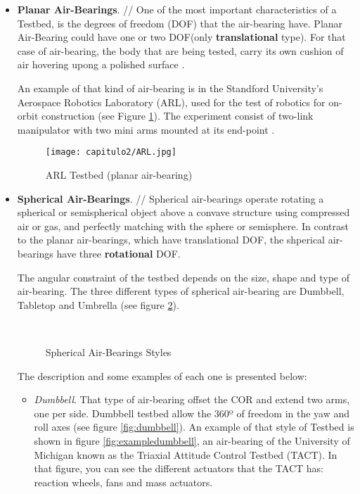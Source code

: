 \begin{itemize}
\item \textbf{Planar Air-Bearings}. //
One of the most important characteristics of a Testbed, is the degrees of freedom (\acrshort{DOF}) that the air-bearing have. Planar Air-Bearing could have one or two \acrshort{DOF}(only \textbf{translational} type). 
For that case of air-bearing, the body that are being tested, carry its own cushion of air hovering upong a polished surface \cite{typestestbed}.

An example of that kind of air-bearing is in the Standford University's Aerospace Robotics Laboratory (ARL), used for the test of robotics for on-orbit construction (see Figure \ref{fig:ARL}). The experiment consist of two-link manipulator with two mini arms mounted at its end-point \cite{ARLtext}. 

\begin{figure}[H]
	\centering
		\texttt{[image: capitulo2/ARL.jpg]}
	\caption{ARL Testbed (planar air-bearing)\cite{ARLtext}}
	\label{fig:ARL}
\end{figure}

\item \textbf{Spherical Air-Bearings}. // Spherical air-bearings operate rotating a spherical or semispherical object above a convave structure using compressed air or gas, and perfectly matching with the sphere or semisphere.
In contrast to the planar air-bearings, which have translational \acrshort{DOF}, the shperical air-bearings have three  \textbf{rotational} \acrshort{DOF}. 

The angular constraint of the testbed depends on the size, shape and type of air-bearing. The three different types of spherical air-bearing are Dumbbell, Tabletop and Umbrella (see figure \ref{fig:airtypes}). 

\begin{figure}[H]
\centering
{} 
 \\
\caption{Spherical Air-Bearings Styles \cite{typestestbed}} \label{fig:airtypes}
\end{figure}

The description and some examples of each one is presented below:
\begin{itemize}
\item \textit{Dumbbell}. That type of air-bearing offset the \acrshort{COR} and extend two arms, one per side. Dumbbell testbed allow the 360º of freedom in the yaw and roll axes (see figure \ref{fig:dumbbell}). An example of that style of Testbed is shown in figure \ref{fig:exampledumbbell}, an air-bearing of the University of Michigan known as the Triaxial Attitude Control Testbed (\acrshort{TACT}). In that figure, you can see the different actuators that the \acrshort{TACT} has: reaction wheels, fans and mass actuators. \cite{michigantestbed}


\end{itemize}
\end{itemize}
